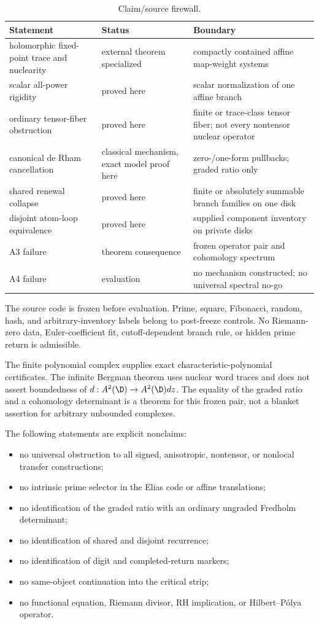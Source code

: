 \begin{table}[ht]
\centering
\caption{Claim/source firewall.}
\label{tab:claim-source}
\small
\begin{tabularx}{\textwidth}{L{4.0cm}L{2.6cm}Y}
\toprule
Statement & Status & Boundary \\
\midrule
holomorphic fixed-point trace and nuclearity
& external theorem specialized
& compactly contained affine map-weight systems \\
scalar all-power rigidity
& proved here
& scalar normalization of one affine branch \\
ordinary tensor-fiber obstruction
& proved here
& finite or trace-class tensor fiber; not every nontensor nuclear operator \\
canonical de Rham cancellation
& classical mechanism, exact model proof here
& zero-/one-form pullbacks; graded ratio only \\
shared renewal collapse
& proved here
& finite or absolutely summable branch families on one disk \\
disjoint atom-loop equivalence
& proved here
& supplied component inventory on private disks \\
A3 failure
& theorem consequence
& frozen operator pair and cohomology spectrum \\
A4 failure
& evaluation
& no mechanism constructed; no universal spectral no-go \\
\bottomrule
\end{tabularx}
\end{table}

The source code is frozen before evaluation.  Prime, square, Fibonacci,
random, hash, and arbitrary-inventory labels belong to post-freeze controls.
No Riemann-zero data, Euler-coefficient fit, cutoff-dependent branch rule,
or hidden prime return is admissible.

The finite polynomial complex supplies exact characteristic-polynomial
certificates.  The infinite Bergman theorem uses nuclear word traces and
does not assert boundedness of \(d:A^2(\D)\to A^2(\D)dz\).  The equality of
the graded ratio and a cohomology determinant is a theorem for this frozen
pair, not a blanket assertion for arbitrary unbounded complexes.

The following statements are explicit nonclaims:
\begin{itemize}
  \item no universal obstruction to all signed, anisotropic, nontensor, or
  nonlocal transfer constructions;
  \item no intrinsic prime selector in the Elias code or affine translations;
  \item no identification of the graded ratio with an ordinary ungraded
  Fredholm determinant;
  \item no identification of shared and disjoint recurrence;
  \item no identification of digit and completed-return markers;
  \item no same-object continuation into the critical strip;
  \item no functional equation, Riemann divisor, RH implication, or
  Hilbert--P\'olya operator.
\end{itemize}

